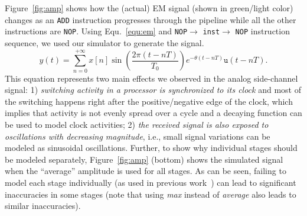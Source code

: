 \documentclass[11 pt]{article}
\begin{document}
Figure~\ref{fig:amp} shows how the (actual) EM signal (shown in green/light color) changes as an {\tt ADD} instruction progresses through the pipeline while all the other instructions are {\tt NOP}. Using Equ.~\ref{equ:em} \cite{Nader2020} and {\tt NOP}$\rightarrow$ {\tt inst}$\rightarrow$ {\tt NOP} instruction sequence, we used our simulator to generate the signal. 
\begin{equation}
y(t) = \sum_{n=0}^{+\infty} x[n] \sin(\frac{2\pi(t-nT)}{T_0})  e^{-\theta(t-nT)}  \mathtt{u}(t-nT).
\label{equ:em}
\end{equation}
This equation represents two main effects we observed in the analog side-channel signal: 1)
\textit{switching activity in a processor is synchronized to its clock} and most of the switching happens right after the positive/negative edge of the clock, which implies that activity is not evenly spread over a cycle and a decaying function can be used to model clock activities; 2) \textit{the received signal is also exposed to oscillations with decreasing magnitude}, i.e., small signal variations can be modeled as sinusoidal oscillations.
Further, to show why individual stages should be modeled separately, Figure~\ref{fig:amp} (bottom) shows the simulated signal when the ``average'' amplitude is used for all stages. As can be seen, failing to model each stage individually (as used in previous work~\cite{McCann:2017:TPT:3241189.3241207}) can lead to significant inaccuracies in some stages (note that using \textit{max} instead of \textit{average} also leads to similar inaccuracies).  \\
\end{document}
